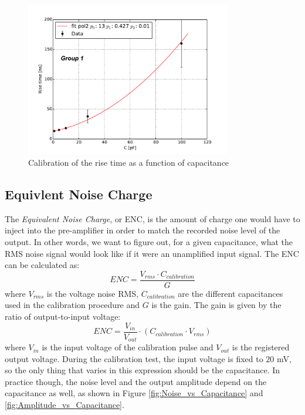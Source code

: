 \documentclass[12pt]{article}
\begin{document}
\begin{figure}[htb]
  \centering
  \includegraphics[width=0.8\textwidth]{./graphics/calibration_diode}
  \caption{Calibration of the rise time as a function of capacitance} %
  \label{fig:RiseTime_vs_Capacitance}
\end{figure}

%
%

\subsection{Equivlent Noise Charge}

The \textit{Equivalent Noise Charge}, or ENC, is the amount of charge one would have to inject into the pre-amplifier in order to match the recorded noise level of the output. In other words, we want to figure out, for a given capacitance, what the RMS noise signal would look like if it were an unamplified input signal. The ENC can be calculated as:
\begin{equation}
ENC = \frac{V_{rms}\cdot C_{calibration}}{G}
\end{equation}
where $V_{rms}$ is the voltage noise RMS, $C_{calibration}$ are the different capacitances used in the calibration procedure and $G$ is the gain.
The gain is given by the ratio of output-to-input voltage:
\begin{equation}
ENC = \frac{V_{in}}{V_{out}}\cdot\left(C_{calibration}\cdot V_{rms}\right)
\end{equation}
where $V_{in}$ is the input voltage of the calibration pulse and $V_{out}$ is the registered output voltage.
During the calibration test, the input voltage is fixed to $20$ mV, so the only thing that varies in this expression should be the capacitance. In practice though, the noise level and the output amplitude depend on the capacitance as well, as shown in Figure \ref{fig:Noise_vs_Capacitance} and \ref{fig:Amplitude_vs_Capacitance}.
\end{document}
